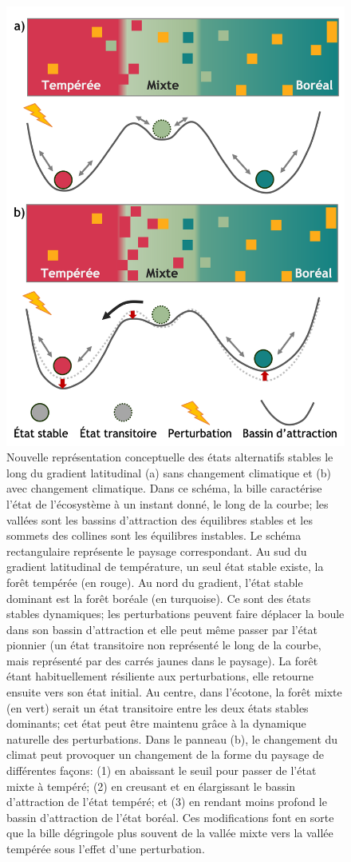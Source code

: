 \begin{figure}
\centering
\includegraphics[width=.63\textwidth]{conclusion/figures/etat_alternatif2.png}
\caption[États alternatifs stables le long du gradient latitudinal]{Nouvelle représentation conceptuelle des états alternatifs stables le long du gradient latitudinal (a) sans changement climatique et (b) avec changement climatique. Dans ce schéma, la bille caractérise l'état de l'écosystème à un instant donné, le long de la courbe; les vallées sont les bassins d'attraction des équilibres stables et les sommets des collines sont les équilibres instables. Le schéma rectangulaire représente le paysage correspondant. Au sud du gradient latitudinal de température, un seul état stable existe, la forêt tempérée (en rouge). Au nord du gradient, l'état stable dominant est la forêt boréale (en turquoise). Ce sont des états stables dynamiques; les perturbations peuvent faire déplacer la boule dans son bassin d'attraction et elle peut même passer par l'état pionnier (un état transitoire non représenté le long de la courbe, mais représenté par des carrés jaunes dans le paysage). La forêt étant habituellement résiliente aux perturbations, elle retourne ensuite vers son état initial. Au centre, dans l'écotone, la forêt mixte (en vert) serait un état transitoire entre les deux états stables dominants; cet état peut être maintenu grâce à la dynamique naturelle des perturbations. Dans le panneau (b), le changement du climat peut provoquer un changement de la forme du paysage de différentes façons: (1) en abaissant le seuil pour passer de l'état mixte à tempéré; (2) en creusant et en élargissant le bassin d'attraction de l'état tempéré; et (3) en rendant moins profond le bassin d'attraction de l'état boréal. Ces modifications font en sorte que la bille dégringole plus souvent de la vallée mixte vers la vallée tempérée sous l'effet d'une perturbation.}
\label{fig4.1}
\end{figure}

